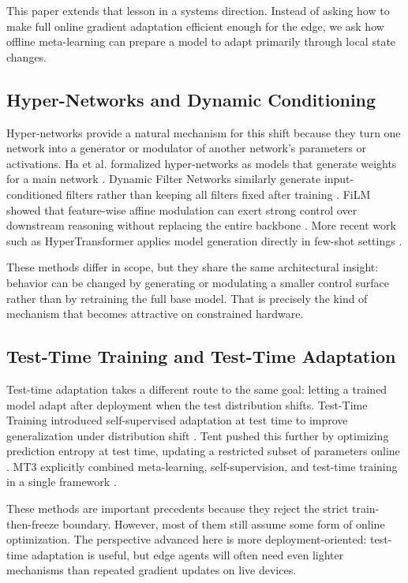 \documentclass[11pt,a4paper]{article}
\begin{document}
This paper extends that lesson in a systems direction. Instead of asking how to make full online gradient adaptation efficient enough for the edge, we ask how offline meta-learning can prepare a model to adapt primarily through local state changes.

\subsection{Hyper-Networks and Dynamic Conditioning}

Hyper-networks provide a natural mechanism for this shift because they turn one network into a generator or modulator of another network's parameters or activations. Ha et al. formalized hyper-networks as models that generate weights for a main network \cite{ha2016hypernetworks}. Dynamic Filter Networks similarly generate input-conditioned filters rather than keeping all filters fixed after training \cite{jia2016dynamic}. FiLM showed that feature-wise affine modulation can exert strong control over downstream reasoning without replacing the entire backbone \cite{perez2018film}. More recent work such as HyperTransformer applies model generation directly in few-shot settings \cite{zhmoginov2022hypertransformer}.

These methods differ in scope, but they share the same architectural insight: behavior can be changed by generating or modulating a smaller control surface rather than by retraining the full base model. That is precisely the kind of mechanism that becomes attractive on constrained hardware.

\subsection{Test-Time Training and Test-Time Adaptation}

Test-time adaptation takes a different route to the same goal: letting a trained model adapt after deployment when the test distribution shifts. Test-Time Training introduced self-supervised adaptation at test time to improve generalization under distribution shift \cite{sun2020ttt}. Tent pushed this further by optimizing prediction entropy at test time, updating a restricted subset of parameters online \cite{wang2021tent}. MT3 explicitly combined meta-learning, self-supervision, and test-time training in a single framework \cite{bartler2022mt3}.

These methods are important precedents because they reject the strict train-then-freeze boundary. However, most of them still assume some form of online optimization. The perspective advanced here is more deployment-oriented: test-time adaptation is useful, but edge agents will often need even lighter mechanisms than repeated gradient updates on live devices.
\end{document}
